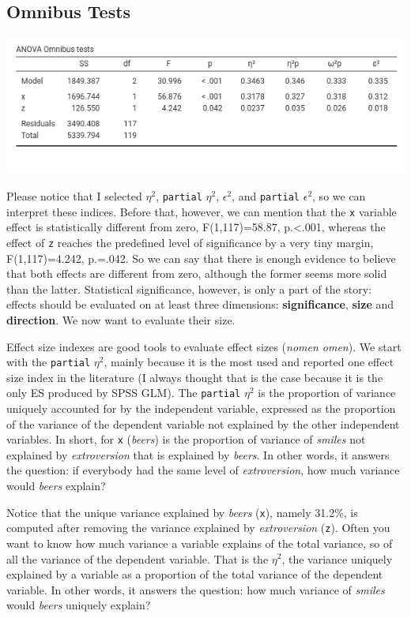 \documentclass[
]{book}
\begin{document}
\hypertarget{variances}{%
\subsection{Omnibus Tests}\label{variances}}

\includegraphics[width=8.53in]{bookletpics/2_output7}

Please notice that I selected \(\eta^2\), \texttt{partial} \(\eta^2\), \(\epsilon^2\), and \texttt{partial} \(\epsilon^2\), so we can interpret these indices. Before that, however, we can mention that the \texttt{x} variable effect is statistically different from zero, F(1,117)=58.87, p.\textless.001, whereas the effect of \texttt{z} reaches the predefined level of significance by a very tiny margin, F(1,117)=4.242, p.=.042. So we can say that there is enough evidence to believe that both effects are different from zero, although the former seems more solid than the latter. Statistical significance, however, is only a part of the story: effects should be evaluated on at least three dimensions: \textbf{significance}, \textbf{size}
and \textbf{direction}. We now want to evaluate their size.

Effect size indexes are good tools to evaluate effect sizes (\emph{nomen omen}). We start with the \texttt{partial} \(\eta^2\), mainly because it is the most used and reported one effect size index in the literature (I always thought that is the case because it is the only ES produced by SPSS GLM). The \texttt{partial} \(\eta^2\) is the proportion of variance uniquely accounted for by the independent variable, expressed as the proportion of the variance of the dependent variable not explained by the other independent variables. In short, for \texttt{x} (\emph{beers}) is the proportion of variance of \emph{smiles} not explained by \emph{extroversion} that is explained by \emph{beers}. In other words, it answers the question: if everybody had the same level of \emph{extroversion}, how much variance would \emph{beers} explain?

Notice that the unique variance explained by \emph{beers} (\texttt{x}), namely 31.2\%, is computed after removing the variance explained by \emph{extroversion} (\texttt{z}). Often you want to know how much variance a variable explains of the total variance, so of all the variance of the dependent variable. That is the \(\eta^2\), the variance uniquely explained by a variable as a proportion of the total variance of the dependent variable. In other words, it answers the question: how much variance of \emph{smiles} would \emph{beers} uniquely explain?
\end{document}
